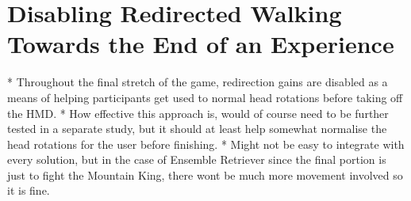\section{Disabling Redirected Walking Towards the End of an Experience}

* Throughout the final stretch of the game, redirection gains are disabled as a means of helping participants get used to normal head rotations before taking off the HMD.
* How effective this approach is, would of course need to be further tested in a separate study, but it should at least help somewhat normalise the head rotations for the user before finishing.
* Might not be easy to integrate with every solution, but in the case of Ensemble Retriever since the final portion is just to fight the Mountain King, there wont be much more movement involved so it is fine. 